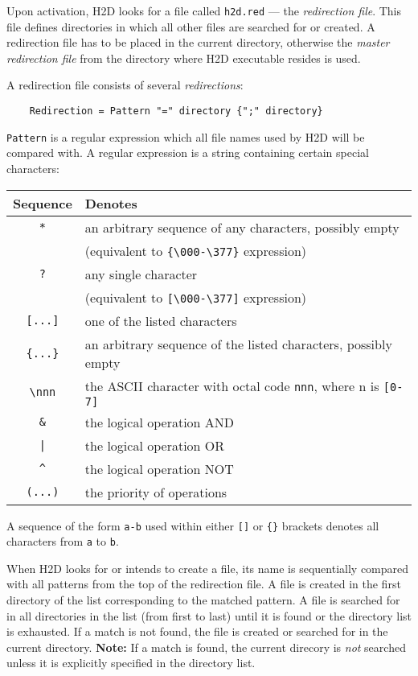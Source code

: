 Upon activation, H2D looks for a file called {\tt h2d.red} --- the
{\em redirection file}. This file defines directories in which all other
files are searched for or created. A redirection file has to be placed
in the current directory, otherwise the {\em master redirection file}
from the directory where H2D executable resides is used.

A redirection file consists of several {\em redirections}:

\verb'    Redirection = Pattern "=" directory {";" directory}'

{\tt Pattern} is a regular expression which all file names used by
H2D will be compared with. A regular expression is a string containing
certain special characters:
\begin{center}
\begin{tabular}{cl}
\bf Sequence & \bf Denotes \\
\hline
\verb+*+     & an arbitrary sequence of any characters, possibly empty \\
             & (equivalent to \verb|{\000-\377}| expression) \\
\verb+?+     & any single character \\
             & (equivalent  to \verb|[\000-\377]| expression) \\
\verb+[...]+ & one of the listed characters \\
\verb+{...}+ & an arbitrary sequence of the listed characters, possibly empty \\
\verb+\nnn+  & the ASCII character with octal code \verb|nnn|, where n is \verb|[0-7]| \\
\verb+&+     & the logical operation AND \\
\verb+|+     & the logical operation OR  \\
\verb+^+     & the logical operation NOT \\
\verb+(...)+ & the priority of operations
\end{tabular}
\end{center}

A  sequence of the  form \verb|a-b|  used  within  either
\verb|[]| or \verb|{}| brackets denotes all characters from
\verb|a| to \verb|b|.

When H2D looks for or intends to create a file, its name is sequentially
compared with all patterns from the top of the redirection file. A file
is created in the first directory of the list corresponding to the matched pattern.
A file is searched for in all directories in the list (from first to last)
until it is found or the directory list is exhausted. If a match is not found,
the file is created or searched for in the current directory. {\bf Note:}
If a match is found, the current direcory is {\em not} searched unless it is
explicitly specified in the directory list.

